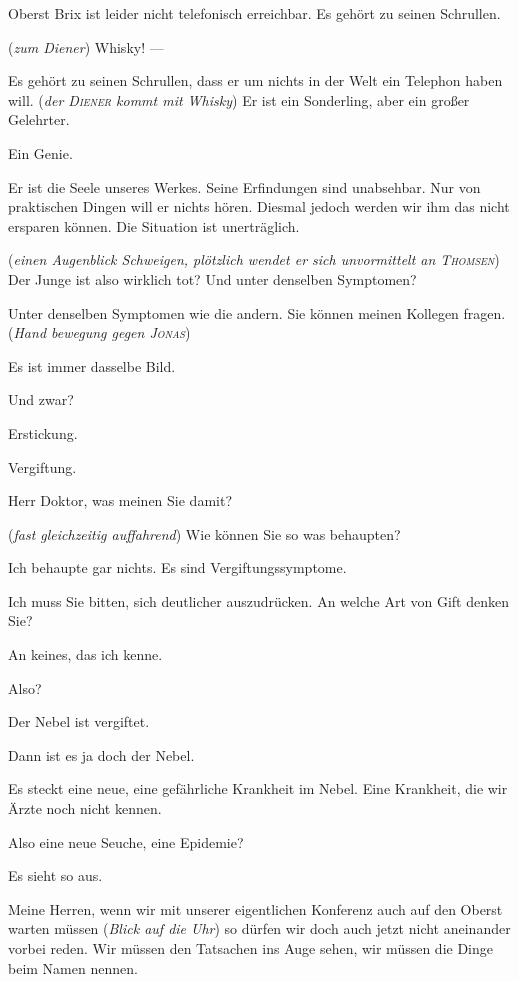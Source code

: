 \documentclass[
	final,
	a4paper,
	ngerman,
	mpinclude = true, %
	twoside = true,
	open = right,
	cleardoublepage = plain,
	DIV = 13,
	BCOR = 1cm,
	titlepage = firstiscover,
	]{scrbook}
\newcommand{\direction}[1]{(\textit{#1})}
\newcommand{\thecharacter}[1]{\textup{\textsc{#1}}\xspace}
\newcommand{\theAlexis}{\thecharacter{Alexis}}
\newcommand{\theThomsen}{\thecharacter{Thomsen}}
\newcommand{\theJonas}{\thecharacter{Jonas}}
\newcommand{\theDiener}{\thecharacter{Diener}}
\newcommand{\character}[1]{\item[#1]}
\newcommand{\Generaldirektor}{\character{Direktor}}
\newcommand{\Alexis}{\character{\theAlexis}}
\newcommand{\Thomsen}{\character{\theThomsen}}
\newcommand{\Jonas}{\character{\theJonas}}
\begin{document}
\begin{play}
Oberst Brix ist leider nicht telefonisch erreichbar. Es gehört zu seinen Schrullen.

\direction{zum Diener} Whisky! ---

Es gehört zu seinen Schrullen, dass er um nichts in der Welt ein Telephon haben will. \direction{der \theDiener kommt mit Whisky} Er ist ein Sonderling, aber ein großer Gelehrter.

\Alexis
Ein Genie.

\Generaldirektor
Er ist die Seele unseres Werkes. Seine Erfindungen sind unabsehbar. Nur von praktischen Dingen will er nichts hören. Diesmal jedoch werden wir ihm das nicht ersparen können. Die Situation ist unerträglich.

\direction{einen Augenblick Schweigen, plötzlich wendet er sich unvormittelt an \theThomsen} Der Junge ist also wirklich tot? Und unter denselben Symptomen?

\Thomsen
Unter denselben Symptomen wie die andern. Sie können meinen Kollegen fragen. \direction{Hand bewegung gegen \theJonas}

\Jonas
Es ist immer dasselbe Bild.

\Generaldirektor
Und zwar?

\Thomsen
Erstickung.

\Jonas
Vergiftung.

\Generaldirektor
Herr Doktor, was meinen Sie damit?

\Alexis
\direction{fast gleichzeitig auffahrend} Wie können Sie so was behaupten?

\Jonas
Ich behaupte gar nichts. Es sind Vergiftungssymptome.

\Generaldirektor
Ich muss Sie bitten, sich deutlicher auszudrücken. An welche Art von Gift denken Sie?

\Jonas
An keines, das ich kenne.

\Generaldirektor
Also?

\Thomsen
Der Nebel ist vergiftet.

\Alexis
Dann ist es ja doch der Nebel.

\Thomsen
Es steckt eine neue, eine gefährliche Krankheit im Nebel. Eine Krankheit, die wir Ärzte noch nicht kennen.

\Alexis
Also eine neue Seuche, eine Epidemie?

\Thomsen
Es sieht so aus.

\Generaldirektor
Meine Herren, wenn wir mit unserer eigentlichen Konferenz auch auf den Oberst warten müssen \direction{Blick auf die Uhr} so dürfen wir doch auch jetzt nicht aneinander vorbei reden. Wir müssen den Tatsachen ins Auge sehen, wir müssen die Dinge beim Namen nennen.


\end{play}
\end{document}
